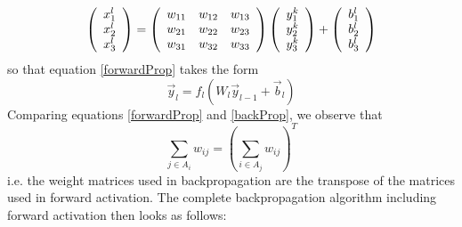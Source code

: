 \documentclass[twoside,english]{uiofysmaster}
\begin{document}
\begin{equation*}
    \left(\begin{array}{c}
            x_1^l \\
            x_2^l \\
            x_3^l \\
          \end{array} \right)
 = \left(\begin{array}{c c c}
            w_{11} & w_{12} & w_{13} \\
            w_{21} & w_{22} & w_{23} \\
	    w_{31} & w_{32} & w_{33} \\
   \end{array} \right)
   \left(\begin{array}{c}
            y_1^k \\
            y_2^k \\
            y_3^k \\
         \end{array}\right)
 + \left(\begin{array}{c}
          b_1^l \\
          b_2^l \\
          b_3^l \\
         \end{array}\right)
\end{equation*}
so that equation \eqref{forwardProp} takes the form
\begin{equation}
\vec{y}_l = f_l(W_l\vec{y}_{l-1} + \vec{b}_l)
\end{equation}
Comparing equations \eqref{forwardProp} and \eqref{backProp}, we observe that 
\begin{equation}
 \sum_{j\in A_i}w_{ij} = \left(\sum_{i\in A_j}w_{ij}\right)^T
\end{equation}
i.e. the weight matrices used in backpropagation are the transpose of the matrices used in forward activation.
The complete backpropagation algorithm including forward activation then looks as follows:
\end{document}
